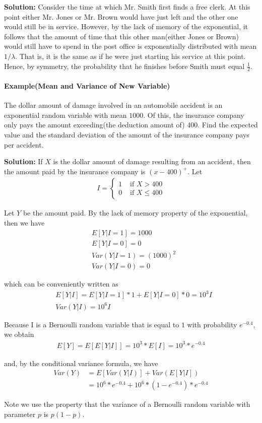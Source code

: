 \documentclass[10 pt,final]{article}
\newcommand{\impo}[1]{{\color{magenta} #1}}
\begin{document}
\textbf{Solution:} Consider the time at which Mr. Smith first finds a free clerk. At this point either Mr. Jones or Mr. Brown would have just left and the other one would still be in service. \impo{However, by the lack of memory of the exponential, it follows that the amount of time that this other man(either Jones or Brown)} would still have to spend in the post office is exponentially distributed with mean $1/\lambda$. That is, \impo{it is the same as if he were just starting his service at this point}. Hence, by symmetry, the probability that he finishes before Smith must equal $\frac{1}{2}$.

\paragraph{Example(Mean and Variance of New Variable)} The dollar amount of damage involved in an automobile accident is an exponential random variable with mean $1000$. Of this, the insurance company only pays the amount exceeding(the deduction amount of) 400. Find the expected value and the standard deviation of the amount of the insurance company pays per accident.

\textbf{Solution:} If $X$ is the dollar amount of damage resulting from an accident, then the amount paid by the insurance company is $(x-400)^+$. Let
\begin{align*}
I =
\begin{cases}
1 & \mbox{ if $X> 400$} \\
0 & \mbox{ if $X \leq 400$}
\end{cases}
\end{align*}

Let $Y$ be the amount paid. By the lack of memory property of the exponential, then we have
\begin{align*}
& E[Y|I=1] = 1000 \\
& E[Y|I=0] = 0 \\
& Var(Y|I=1) = (1000)^2 \\
& Var(Y|I=0) = 0
\end{align*}

which can be conveniently written as
\impo{
\begin{align*}
& E[Y|I] = E[Y|I=1]*1 + E[Y|I=0]*0 = 10^3 I \\ 
& Var(Y|I) = 10^6 I
\end{align*}
}

Because I is a Bernoulli random variable that is equal to $1$ with probability \impo{$e^{-0.4}$}, we obtain
\begin{align*}
E[Y] = E[E[Y|I]] = 10^3*E[I] = 10^3*e^{-0.4}
\end{align*}

and, by the \impo{conditional variance formula}, we have
\begin{align*}
Var(Y) & = E[Var(Y|I)] + Var(E[Y|I]) \\
& = 10^6 * e^{-0.4} + 10^6 *(1-e^{-0.4})*e^{-0.4}
\end{align*}

Note we use the property that the variance of a Bernoulli random variable with parameter $p$ is $p(1-p)$.
\end{document}
